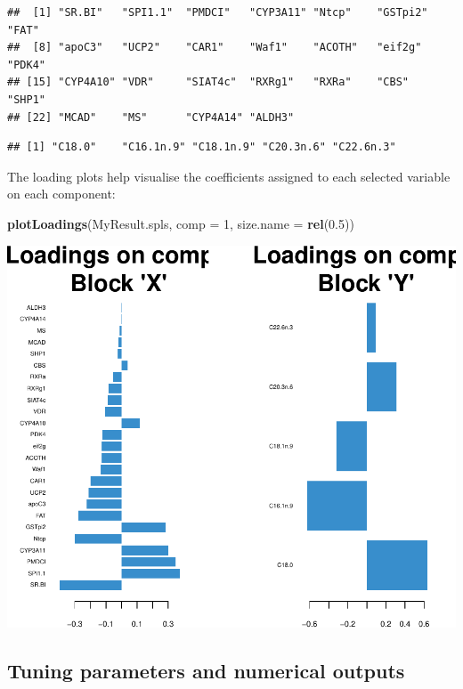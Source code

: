 \documentclass[]{book}
\newenvironment{Shaded}{\begin{snugshade}}{\end{snugshade}}
\newcommand{\CommentTok}[1]{\textcolor[rgb]{0.56,0.35,0.01}{\textit{#1}}}
\newcommand{\DataTypeTok}[1]{\textcolor[rgb]{0.13,0.29,0.53}{#1}}
\newcommand{\DecValTok}[1]{\textcolor[rgb]{0.00,0.00,0.81}{#1}}
\newcommand{\FloatTok}[1]{\textcolor[rgb]{0.00,0.00,0.81}{#1}}
\newcommand{\KeywordTok}[1]{\textcolor[rgb]{0.13,0.29,0.53}{\textbf{#1}}}
\newcommand{\NormalTok}[1]{#1}
\newcommand{\OperatorTok}[1]{\textcolor[rgb]{0.81,0.36,0.00}{\textbf{#1}}}
\begin{document}
\begin{verbatim}
##  [1] "SR.BI"   "SPI1.1"  "PMDCI"   "CYP3A11" "Ntcp"    "GSTpi2"  "FAT"    
##  [8] "apoC3"   "UCP2"    "CAR1"    "Waf1"    "ACOTH"   "eif2g"   "PDK4"   
## [15] "CYP4A10" "VDR"     "SIAT4c"  "RXRg1"   "RXRa"    "CBS"     "SHP1"   
## [22] "MCAD"    "MS"      "CYP4A14" "ALDH3"
\end{verbatim}

\begin{Shaded}
\end{Shaded}

\begin{verbatim}
## [1] "C18.0"    "C16.1n.9" "C18.1n.9" "C20.3n.6" "C22.6n.3"
\end{verbatim}

The loading plots help visualise the coefficients assigned to each selected variable on each component:

\begin{Shaded}
\begin{Highlighting}[]
\KeywordTok{plotLoadings}\NormalTok{(MyResult.spls, }\DataTypeTok{comp =} \DecValTok{1}\NormalTok{, }\DataTypeTok{size.name =} \KeywordTok{rel}\NormalTok{(}\FloatTok{0.5}\NormalTok{))}
\end{Highlighting}
\end{Shaded}

\begin{center}\includegraphics[width=0.5\linewidth,]{Figures/05-pls-plotLoadings-1-1} \end{center}

\hypertarget{tuning:PLS}{%
\subsection{Tuning parameters and numerical outputs}\label{tuning:PLS}}
\end{document}
